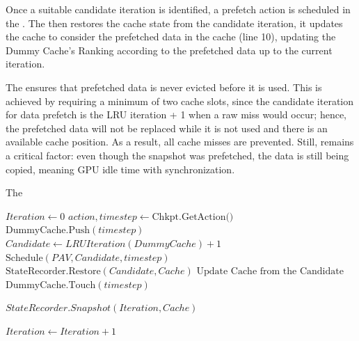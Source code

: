 \documentclass[Ingles]{ic-tese-v3}
\begin{document}
Once a suitable candidate iteration is identified, a prefetch action is scheduled in the \pav. The  then restores the cache state from the candidate iteration, it updates the cache to consider the prefetched data in the cache (line 10), updating the Dummy Cache's Ranking according to the prefetched data up to the current iteration.


The \psa ensures that prefetched data is never evicted before it is used. This is achieved by requiring a minimum of two cache slots, since the candidate iteration for data prefetch is the LRU iteration + 1 when a raw miss would occur; hence, the prefetched data will not be replaced while it is not used and there is an available cache position. As a result, all cache misses are prevented. Still,  remains a critical factor: even though the snapshot was prefetched, the data is still being copied, meaning GPU idle time with synchronization.


\begin{algorithm}[H]
\caption{The \psa}
\label{alg:setup}
\begin{algorithmic}[1]
    \STATE $Iteration \gets 0$
    \REPEAT
        \STATE $action, timestep \gets \text{Chkpt.GetAction()}$
            \STATE $\text{DummyCache.Push}(timestep)$
                \STATE $Candidate \gets LRUIteration(DummyCache) + 1$
                \STATE $\text{Schedule}(PAV, Candidate, timestep)$
                \STATE $\text{StateRecorder.Restore}(Candidate, Cache)$
                \STATE $\text{Update Cache from the Candidate}$
            \ELSE
                \STATE $\text{DummyCache.Touch}(timestep)$ 
            \ENDIF
        \ENDIF

        \STATE $StateRecorder.Snapshot(Iteration, Cache)$

        \STATE $Iteration \gets Iteration + 1$
\end{algorithmic}
\end{algorithm}
\end{document}
